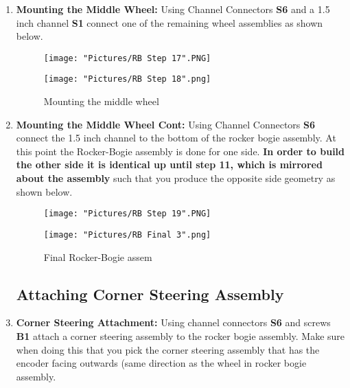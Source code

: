 \documentclass[12pt]{article}
\begin{document}
\begin{enumerate}

\item \textbf{Mounting the Middle Wheel: } Using Channel Connectors \textbf{S6} and a 1.5 inch channel \textbf{S1} connect one of the remaining wheel assemblies as shown below. 

\begin{figure}[H]
  \centering
  \begin{minipage}[b]{0.45\textwidth}
    \texttt{[image: "Pictures/RB Step 17".PNG]}
  \end{minipage}
  \hfill
  \begin{minipage}[b]{0.45\textwidth}
    \texttt{[image: "Pictures/RB Step 18".png]}
  \end{minipage}
  \caption{Mounting the middle wheel}
\end{figure}

\item \textbf{Mounting the Middle Wheel Cont: } Using Channel Connectors \textbf{S6} connect the 1.5 inch channel to the bottom of the rocker bogie assembly. At this point the Rocker-Bogie assembly is done for one side. \textbf{In order to build the other side it is identical up until step 11, which is mirrored about the assembly} such that you produce the opposite side geometry as shown below. 

\begin{figure}[H]
  \centering
  \begin{minipage}[b]{0.45\textwidth}
    \texttt{[image: "Pictures/RB Step 19".PNG]}
  \end{minipage}
  \hfill
  \begin{minipage}[b]{0.45\textwidth}
    \texttt{[image: "Pictures/RB Final 3".png]}
  \end{minipage}
  \caption{Final Rocker-Bogie assem}
\end{figure}


\subsection{Attaching Corner Steering Assembly}

\item \textbf{Corner Steering Attachment: } Using channel connectors \textbf{S6} and screws \textbf{B1} attach a corner steering assembly to the rocker bogie assembly. Make sure when doing this that you pick the corner steering assembly that has the encoder facing outwards (same direction as the wheel in rocker bogie assembly.


\end{enumerate}
\end{document}
